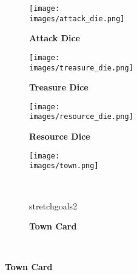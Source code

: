 \begin{figure}[H]
  \centering
  \begin{subfigure}[c]{0.15\linewidth}
    \centering
    \texttt{[image: \\images/attack\_die.png]}
    \caption{\textbf{Attack Dice} \\\phantom{Population}}
  \end{subfigure}
  \begin{subfigure}[c]{0.15\linewidth}
    \centering
    \texttt{[image: \\images/treasure\_die.png]}
    \caption{\textbf{Treasure Dice}}
  \end{subfigure}
  \begin{subfigure}[c]{0.15\linewidth}
    \centering
    \texttt{[image: \\images/resource\_die.png]}
    \caption{\textbf{Resource Dice}}
  \end{subfigure}
  \begin{subfigure}[c]{0.25\linewidth}
    \texttt{[image: \\images/town.png]}
    \caption{\textbf{}}
  \end{subfigure}
  ~
  \begin{subfigure}[c]{0.22\linewidth}
    \begin{expansionmini}{stretchgoals2}
      \centering
      \caption{\textbf{Town Card}}
    \end{expansionmini}
  \end{subfigure}
  ~
\end{figure}

